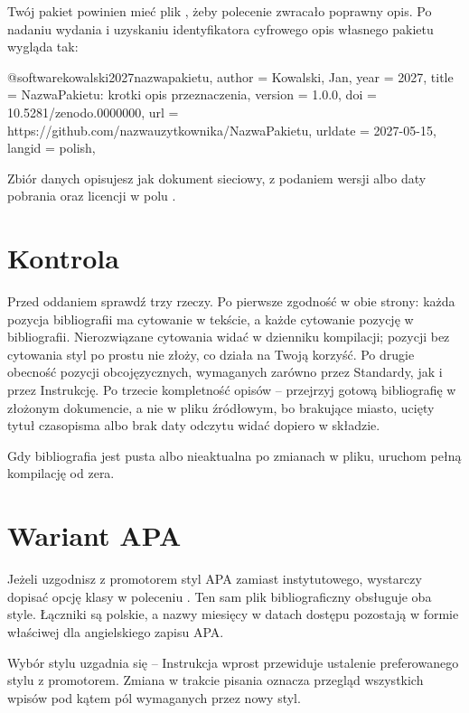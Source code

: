 Twój pakiet powinien mieć plik , żeby polecenie  zwracało poprawny opis. Po nadaniu wydania i uzyskaniu identyfikatora cyfrowego opis własnego pakietu wygląda tak:

\begin{zapis}
@software{kowalski2027nazwapakietu,
  author  = {Kowalski, Jan},
  year    = {2027},
  title   = {NazwaPakietu: krotki opis przeznaczenia},
  version = {1.0.0},
  doi     = {10.5281/zenodo.0000000},
  url     = {https://github.com/nazwauzytkownika/NazwaPakietu},
  urldate = {2027-05-15},
  langid  = {polish},
}
\end{zapis}

Zbiór danych opisujesz jak dokument sieciowy, z podaniem wersji albo daty pobrania oraz licencji w polu .

\section{Kontrola}

Przed oddaniem sprawdź trzy rzeczy. Po pierwsze zgodność w obie strony: każda pozycja bibliografii ma cytowanie w tekście, a każde cytowanie pozycję w bibliografii. Nierozwiązane cytowania widać w dzienniku kompilacji; pozycji bez cytowania styl po prostu nie złoży, co działa na Twoją korzyść. Po drugie obecność pozycji obcojęzycznych, wymaganych zarówno przez Standardy, jak i przez Instrukcję. Po trzecie kompletność opisów -- przejrzyj gotową bibliografię w złożonym dokumencie, a nie w pliku źródłowym, bo brakujące miasto, ucięty tytuł czasopisma albo brak daty odczytu widać dopiero w składzie.

Gdy bibliografia jest pusta albo nieaktualna po zmianach w pliku, uruchom pełną kompilację od zera.

\section{Wariant APA}

Jeżeli uzgodnisz z promotorem styl APA zamiast instytutowego, wystarczy dopisać opcję klasy  w poleceniu . Ten sam plik bibliograficzny obsługuje oba style. Łączniki są polskie, a nazwy miesięcy w datach dostępu pozostają w formie właściwej dla angielskiego zapisu APA.

Wybór stylu uzgadnia się  -- Instrukcja wprost przewiduje ustalenie preferowanego stylu z promotorem. Zmiana w trakcie pisania oznacza przegląd wszystkich wpisów pod kątem pól wymaganych przez nowy styl.

